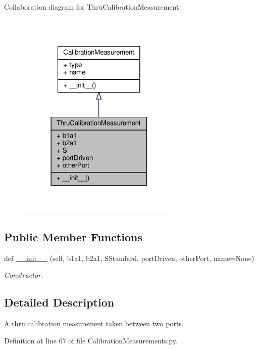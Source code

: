 Collaboration diagram for Thru\+Calibration\+Measurement\+:
\nopagebreak
\begin{figure}[H]
\begin{center}
\leavevmode
\includegraphics[width=222pt]{classSignalIntegrity_1_1Measurement_1_1Calibration_1_1CalibrationMeasurements_1_1ThruCalibrationMeasurement__coll__graph}
\end{center}
\end{figure}
\subsection*{Public Member Functions}
\begin{DoxyCompactItemize}
\item 
def \hyperlink{classSignalIntegrity_1_1Measurement_1_1Calibration_1_1CalibrationMeasurements_1_1ThruCalibrationMeasurement_a8ec7025d943b2d2fe8d0b1761833aabd}{\+\_\+\+\_\+init\+\_\+\+\_\+} (self, b1a1, b2a1, S\+Standard, port\+Driven, other\+Port, name=None)
\begin{DoxyCompactList}\small\item\em Constructor. \end{DoxyCompactList}\end{DoxyCompactItemize}


\subsection{Detailed Description}
A thru calibration measurement taken between two ports. 



Definition at line 67 of file Calibration\+Measurements.\+py.



